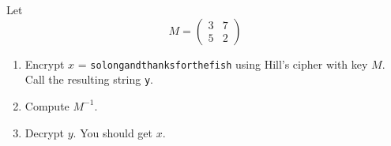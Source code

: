   Let
  \[
  M =
  \begin{pmatrix}
    3 & 7 \\
    5 & 2 
  \end{pmatrix}
  \]
  \begin{enumerate}[nosep]
  \item Encrypt $x$ = \verb!solongandthanksforthefish!
    using Hill's cipher with key $M$. Call the
    resulting string \verb!y!.
  \item Compute $M^{-1}$.
  \item Decrypt $y$. You should get $x$.
  \end{enumerate}
